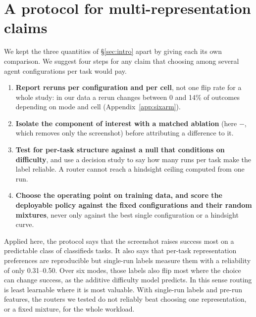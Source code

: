 \section{A protocol for multi-representation claims}\label{sec:method}

We kept the three quantities of \S\ref{sec:intro} apart by giving each its own comparison. We suggest four steps for any claim that choosing among several agent configurations per task would pay.

\begin{enumerate}\setlength{\itemsep}{1pt}
  \item \textbf{Report reruns per configuration and per cell}, not one flip rate for a whole study: in our data a rerun changes between 0 and 14\% of outcomes depending on mode and cell (Appendix~\ref{app:sixarm}).
  \item \textbf{Isolate the component of interest with a matched ablation} (here \SoM$-$\PSoM, which removes only the screenshot) before attributing a difference to it.
  \item \textbf{Test for per-task structure against a null that conditions on difficulty}, and use a decision study to say how many runs per task make the label reliable. A router cannot reach a hindsight ceiling computed from one run.
  \item \textbf{Choose the operating point on training data, and score the deployable policy against the fixed configurations and their random mixtures}, never only against the best single configuration or a hindsight curve.
\end{enumerate}

Applied here, the protocol says that the screenshot raises success most on a predictable class of classifieds tasks. It also says that per-task representation preferences are reproducible but single-run labels measure them with a reliability of only 0.31--0.50. Over six modes, those labels also flip most where the choice can change success, as the additive difficulty model predicts. In this sense routing is least learnable where it is most valuable. With single-run labels and pre-run features, the routers we tested do not reliably beat choosing one representation, or a fixed mixture, for the whole workload.
